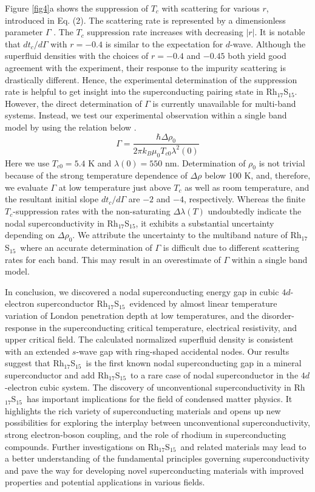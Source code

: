 \documentclass[aps,pra,reprint,superscriptaddress,floatfix]{revtex4-2}
\newcommand{\rhs}{Rh$_{17}$S$_{15}$}
\begin{document}
Figure \ref{fig4}a shows the suppression of $T_c$ with scattering for various $r$, introduced in Eq. (2). The scattering rate is represented by a dimensionless parameter $\Gamma$ \cite{Prozorov2014}. The $T_c$ suppression rate increases with decreasing $|r|$. It is notable that $dt_c/d\Gamma$ with $r=-0.4$ is similar to the expectation for $d$-wave. Although the superfluid densities with the choices of $r=-0.4$ and $-0.45$ both yield good agreement with the experiment, their response to the impurity scattering is drastically different. Hence, the experimental determination of the suppression rate is helpful to get insight into the superconducting pairing state in \rhs. However, the direct determination of $\Gamma$ is currently unavailable for multi-band systems. Instead, we test our experimental observation within a single band model by using the relation below \cite{Prozorov2014}. 
\begin{equation}
    \Gamma = \frac{\hbar \Delta\rho_0}{2\pi k_B \mu_0 T_{c0} \lambda^2(0)}
\end{equation}
Here we use $T_{c0}=5.4$ K and $\lambda(0)=550$ nm. Determination of $\rho_0$ is not trivial because of the strong temperature dependence of $\Delta \rho$ below 100 K, and, therefore, we evaluate $\Gamma$ at low temperature just above $T_c$ as well as room temperature, and the resultant initial slope $dt_c/d\Gamma$ are $-2$ and $-4$, respectively. Whereas the finite $T_c$-suppression rates with the non-saturating $\Delta \lambda(T)$ undoubtedly indicate the nodal superconductivity in \rhs, it exhibits a substantial uncertainty depending on $\Delta\rho_0$. We attribute the uncertainty to the multiband nature of \rhs~where an accurate determination of $\Gamma$ is difficult due to different scattering rates for each band. This may result in an overestimate of $\Gamma$ within a single band model.


In conclusion, we discovered a nodal superconducting energy gap in cubic $4d$-electron superconductor \rhs~evidenced by almost linear temperature variation of London penetration depth at low temperatures, and the disorder-response in the superconducting critical temperature, electrical resistivity, and upper critical field. The calculated normalized superfluid density is consistent with an extended $s$-wave gap with ring-shaped accidental nodes. Our results suggest that \rhs~is the first known nodal superconducting gap in a mineral superconductor and add \rhs~to a rare case of nodal superconductor in the $4d$-electron cubic system. The discovery of unconventional superconductivity in \rhs~has important implications for the field of condensed matter physics. It highlights the rich variety of superconducting materials and opens up new possibilities for exploring the interplay between unconventional superconductivity, strong electron-boson coupling, and the role of rhodium in superconducting compounds. Further investigations on \rhs~and related materials may lead to a better understanding of the fundamental principles governing superconductivity and pave the way for developing novel superconducting materials with improved properties and potential applications in various fields.
\end{document}
